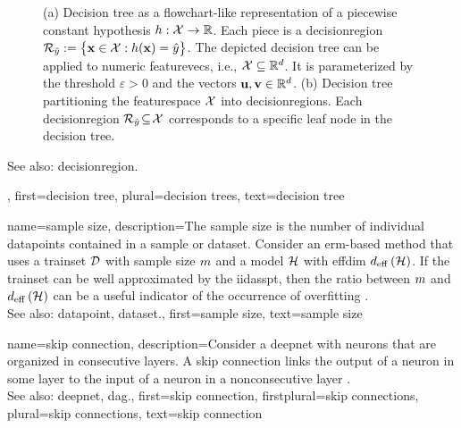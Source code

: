 {{\begin{figure}[H]
\begin{minipage}{.45\textwidth}
		\end{minipage}
		\caption{(a) Decision tree as a flowchart-like representation of a piecewise constant \gls{hypothesis} 
			$h: \mathcal{X} \rightarrow \mathbb{R}$. Each piece is a \gls{decisionregion} 
			$\mathcal{R}_{\hat{y}} := \big\{ {\bf x} \in  \mathcal{X}: h({\bf x}) = \hat{y} \big\}$. 
			The depicted decision tree can be applied to numeric \glspl{featurevec}, i.e., $\mathcal{X} \subseteq \mathbb{R}^{d}$. 
			It is parameterized by the threshold $\varepsilon>0$ and the \glspl{vector} ${\bf u}, {\bf v} \in \mathbb{R}^{d}$. 
			(b) Decision tree partitioning the \gls{featurespace} $\mathcal{X}$ into \glspl{decisionregion}. Each \gls{decisionregion}  
			$\mathcal{R}_{\hat{y}} \!\subseteq\!\mathcal{X}$ corresponds to a specific leaf node in the decision tree.}
			\label{fig_decision_tree_dict}
		\end{figure} 
		See also: \gls{decisionregion}.},
	  first={decision tree},
	  plural={decision trees},
	  text={decision tree} 
}

{name={sample size},
	description={The \gls{sample} size is the number of individual \glspl{datapoint} contained in a 
	    	\gls{sample} or \gls{dataset}. Consider an \gls{erm}-based method that uses a 
		\gls{trainset} $\mathcal{D}$ with \gls{sample} size $m$ 
		and a \gls{model} $\mathcal{H}$ with \gls{effdim} $d_{\rm eff} \left( \mathcal{H} \right)$. If the \gls{trainset} can 
		be well approximated by the \gls{iidasspt}, then the ratio between $m$ 
		and $d_{\rm eff} \left( \mathcal{H} \right)$ can be a useful indicator of the occurrence of \gls{overfitting} \cite[Ch. 6]{MLBasics}.
				\\
		See also: \gls{datapoint}, \gls{dataset}.},
	first={sample size},
	text={sample size}
}

{name={skip connection},
	description={Consider a \gls{deepnet} with neurons that are organized 
		in consecutive \glspl{layer}. A skip connection links the \gls{output} of a neuron in 
		some \gls{layer} to the input of a neuron in a nonconsecutive \gls{layer} \cite{HeResidual2016}.
		\\
		See also: \gls{deepnet}, \gls{dag}.},
 	first={skip connection},
 	firstplural={skip connections}, 
 	plural={skip connections}, 
 	text={skip connection}
}

